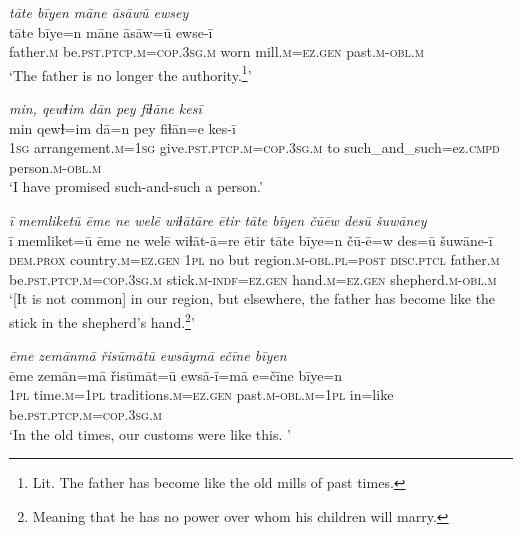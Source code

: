\ea \label{RE.33}
\textit{tāte bīyen māne āsāwū ewsey} \\ 
\gll tāte bīye=n māne āsāw=ū ewse-ī \\ 
 father\textsc{.m} be\textsc{.pst}\textsc{.ptcp}\textsc{.m}\textsc{=cop}\textsc{.3sg}\textsc{.m} worn mill\textsc{.m}\textsc{=ez.gen} past\textsc{.m}\textsc{-obl}\textsc{.m} \\ 
\glt `The father is no longer the authority.\footnote{Lit. The father has become like the old mills of past times.}'
\z 
 
\ea \label{RE.36}
\textit{min, qewɫim dān pey fiɫāne kesī} \\ 
\gll min qewɫ=im dā=n pey fiɫān=e kes-ī \\ 
 \textsc{1sg} arrangement\textsc{.m}\textsc{=\textsc{1sg}} give\textsc{.pst}\textsc{.ptcp}\textsc{.m}\textsc{=cop}\textsc{.3sg}\textsc{.m} to such\_and\_such=ez\textsc{.cmpd} person\textsc{.m}\textsc{-obl}\textsc{.m} \\ 
\glt `I have promised such-and-such a person.'
\z 
 
\ea \label{RE.41}
\textit{ī memliketū ēme ne welē wiɫātāre ētir tāte bīyen čūēw desū šuwāney} \\ 
\gll ī memliket=ū ēme ne welē wiɫāt-ā=re ētir tāte bīye=n čū-ē=w des=ū šuwāne-ī \\ 
 \textsc{dem.prox} country\textsc{.m}\textsc{=ez.gen} \textsc{1pl} no but region\textsc{.m}\textsc{-obl}\textsc{.pl}\textsc{=\textsc{post}} \textsc{disc.ptcl} father\textsc{.m} be\textsc{.pst}\textsc{.ptcp}\textsc{.m}\textsc{=cop}\textsc{.3sg}\textsc{.m} stick\textsc{.m}\textsc{-indf}\textsc{=ez.gen} hand\textsc{.m}\textsc{=ez.gen} shepherd\textsc{.m}\textsc{-obl}\textsc{.m} \\ 
\glt `[It is not common] in our region, but elsewhere, the father has become like the stick in the shepherd’s hand.\footnote{Meaning that he has no power over whom his children will marry.}'
\z 
 
\ea \label{RE.42}
\textit{ēme zemānmā řisūmātū ewsāymā ečīne bīyen} \\ 
\gll ēme zemān=mā řisūmāt=ū ewsā-ī=mā e=čīne bīye=n \\ 
 \textsc{1pl} time\textsc{.m}\textsc{=\textsc{1pl}} traditions\textsc{.m}\textsc{=ez.gen} past\textsc{.m}\textsc{-obl}\textsc{.m}\textsc{=\textsc{1pl}} in=like be\textsc{.pst}\textsc{.ptcp}\textsc{.m}\textsc{=cop}\textsc{.3sg}\textsc{.m} \\ 
\glt `In the old times, our customs were like this. '
\z 
 
